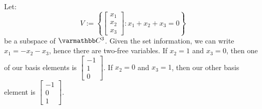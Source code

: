 \begin{example}
	Let:
	\[
		V := \left\{ \begin{bmatrix} x_1 \\ x_2 \\ x_3 \end{bmatrix} : x_1 + x_2 + x_3 = 0 \right\}
	\] 
	be a subspace of $\bfC^3$. Given the set information, we can write $x_1 = -x_2 - x_3$, hence there are two-free variables. If $x_2 = 1$ and $x_3 = 0$, then one of our basis elements is $\begin{bmatrix} -1 \\ 1 \\ 0 \end{bmatrix}$. If $x_2 = 0$ and $x_3 = 1$, then our other basis element is $\begin{bmatrix} -1 \\ 0 \\ 1 \end{bmatrix}$.


\end{example}
